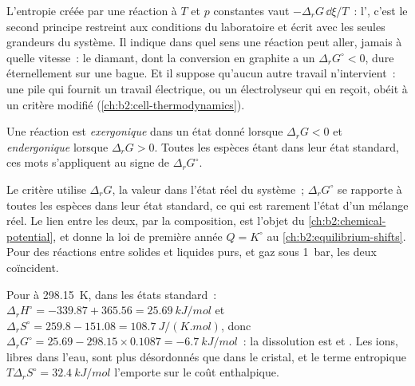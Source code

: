 \begin{remark}\label{rem:b2:reaction-free-energy:criterion}
L'entropie créée par une réaction à $T$ et $p$ constantes vaut $-\Delta_r G\,
\dd\xi/T$~: l', c'est le second principe restreint aux conditions
du laboratoire et écrit avec les seules grandeurs du système. Il indique
dans quel sens une réaction peut aller, jamais à quelle vitesse~: le diamant, dont
la conversion en graphite a un $\Delta_r G^\circ < 0$, dure éternellement sur une
bague. Et il suppose qu'aucun autre travail n'intervient~: une pile qui fournit un travail électrique, ou un
électrolyseur qui en reçoit, obéit à un critère modifié
(\cref{ch:b2:cell-thermodynamics}).
\end{remark}

\begin{definition}\label{def:b2:reaction-free-energy:exergonic}
Une réaction est \emph{exergonique} dans un état donné lorsque
$\Delta_r G < 0$ et \emph{endergonique} lorsque $\Delta_r G >
0$. Toutes les espèces étant dans leur état standard, ces mots s'appliquent au signe
de $\Delta_r G^\circ$.
\end{definition}

Le critère utilise $\Delta_r G$, la valeur dans l'état réel du
système~; $\Delta_r G^\circ$ se rapporte à toutes les espèces dans leur état standard,
ce qui est rarement l'état d'un mélange réel. Le lien entre les deux, par
la composition, est l'objet du \cref{ch:b2:chemical-potential}, et
donne la loi de première année $Q = K^\circ$ au \cref{ch:b2:equilibrium-shifts}. Pour
des réactions entre solides et liquides purs, et gaz sous \qty{1}{bar}, les
deux coïncident.

\begin{example}\label{ex:b2:reaction-free-energy:cold-pack}
Pour  à \qty{298.15}{K}, dans les états
standard~: $\Delta_r H^\circ = -339.87 + 365.56 = \qty{+25.69}{kJ/mol}$ et
$\Delta_r S^\circ = 259.8 - 151.08 = \qty{+108.7}{J/(K.mol)}$, donc
$\Delta_r G^\circ = 25.69 - 298.15 \times 0.1087 = \qty{-6.7}{kJ/mol}$~: la
dissolution est  et . Les ions, libres dans l'eau, sont
plus désordonnés que dans le cristal, et le terme entropique $T\Delta_r
S^\circ = \qty{32.4}{kJ/mol}$ l'emporte sur le coût enthalpique.
\end{example}


